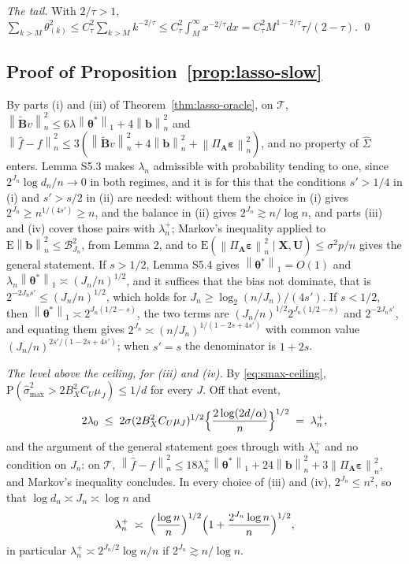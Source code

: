 \documentclass[10pt]{book}
\theoremstyle{definition}
\newcommand{\E}{\mathrm{E}}
\newcommand{\Prob}{\mathrm{P}}
\newcommand{\norm}[1]{\left\lVert #1 \right\rVert}
\newcommand{\normn}[1]{\left\lVert #1 \right\rVert_{n}}
\newcommand{\bX}{\mathbf{X}}
\newcommand{\bU}{\mathbf{U}}
\newcommand{\btheta}{\boldsymbol{\theta}}
\newcommand{\thetastar}{\btheta^{*}}
\newcommand{\Gramhat}{\widehat{\Sigma}}
\newcommand{\pen}{\lambda}
\newcommand{\penn}{\lambda_{n}}
\newcommand{\seff}{s'}
\newcommand{\Amat}{\mathbf{A}}
\newcommand{\Bmat}{\mathbf{B}}
\newcommand{\Btil}{\widetilde{\Bmat}}
\newcommand{\PA}{\Pi_{\Amat}}
\newcommand{\bveps}{\boldsymbol{\varepsilon}}
\newcommand{\bb}{\mathbf{b}}
\newcommand{\smax}{\widehat{\sigma}_{\max}}
\begin{document}
{\emph{The tail.} With $2/\tau>1$,
$\sum_{k>M}\theta^2_{(k)} \le C_\tau^2\sum_{k>M}k^{-2/\tau} \le
C_\tau^2\int_M^{\infty}x^{-2/\tau}dx = C_\tau^2M^{1-2/\tau}\tau/(2-\tau)$.
\qed

\subsection*{Proof of Proposition~\ref{prop:lasso-slow}}

By parts (i) and (iii) of Theorem~\ref{thm:lasso-oracle}, on $\mathcal{T}$,
$\normn{\Btil v}^2 \le 6\pen\norm{\thetastar}_1+4\normn{\bb}^2$ and
$\normn{\widehat{f}-f}^2 \le 3(\normn{\Btil v}^2+4\normn{\bb}^2+
\normn{\PA\bveps}^2)$, and no property of $\Gramhat$ enters. Lemma S5.3 makes
$\penn$ admissible with probability tending to one, since
$2^{J_n}\log d_n/n \to 0$ in both regimes, and it is for this that the conditions
$\seff > 1/4$ in (i) and $\seff > s/2$ in (ii) are needed: without them the choice
in (i) gives $2^{J_n} \ge n^{1/(4\seff)} \ge n$, and the balance in (ii) gives
$2^{J_n} \gtrsim n/\log n$, and parts (iii) and (iv) cover those pairs with
$\penn^{+}$; Markov's inequality
applied to $\E\normn{\bb}^2 \le \mathcal{B}^2_{J_n}$, from Lemma 2, and to
$\E(\normn{\PA\bveps}^2\mid\bX,\bU) \le \sigma^2p/n$ gives the general
statement. If $s>1/2$, Lemma S5.4 gives $\norm{\thetastar}_1 = O(1)$ and
$\penn\norm{\thetastar}_1 \asymp (J_n/n)^{1/2}$, and it suffices that the bias
not dominate, that is $2^{-2J_n\seff} \le (J_n/n)^{1/2}$, which holds for
$J_n \ge \log_2(n/J_n)/(4\seff)$. If $s<1/2$, then
$\norm{\thetastar}_1 \asymp 2^{J_n(1/2-s)}$, the two terms are
$(J_n/n)^{1/2}2^{J_n(1/2-s)}$ and $2^{-2J_n\seff}$, and equating them gives
$2^{J_n} \asymp (n/J_n)^{1/(1-2s+4\seff)}$ with common value
$(J_n/n)^{2\seff/(1-2s+4\seff)}$; when $\seff = s$ the denominator is
$1+2s$.

\emph{The level above the ceiling, for (iii) and (iv).} By
\eqref{eq:smax-ceiling}, $\Prob(\smax^{2} > 2B_X^{2}C_U\mu_{J}) \le 1/d$ for
every $J$. Off that event,
\[
  2\pen_0 \;\le\; 2\sigma(2B_X^{2}C_U\mu_{J})^{1/2}
  \Bigl\{\frac{2\log(2d/\alpha)}{n}\Bigr\}^{1/2} \;=\; \penn^{+},
\]
and the argument of the general statement goes through with
$\penn^{+}$ and no condition on $J_n$: on $\mathcal{T}$,
$\normn{\widehat{f}-f}^{2} \le 18\penn^{+}\norm{\thetastar}_{1} +
24\normn{\bb}^{2} + 3\normn{\PA\bveps}^{2}$, and Markov's inequality
concludes. In every choice of (iii) and (iv), $2^{J_n} \le n^{2}$, so that
$\log d_n \asymp J_n \asymp \log n$ and
\begin{equation}
  \label{eq:lam-plus}
  \penn^{+} \;\asymp\; \Bigl(\frac{\log n}{n}\Bigr)^{1/2}
  \Bigl(1 + \frac{2^{J_n}\log n}{n}\Bigr)^{1/2},
\end{equation}
in particular $\penn^{+} \asymp 2^{J_n/2}\log n/n$ if
$2^{J_n} \gtrsim n/\log n$.

}
\end{document}
